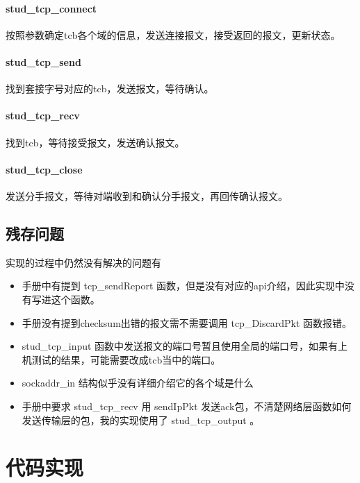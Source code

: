 \documentclass{article}
\begin{document}
\paragraph{stud\_tcp\_connect} 按照参数确定tcb各个域的信息，发送连接报文，接受返回的报文，更新状态。

\paragraph{stud\_tcp\_send} 找到套接字号对应的tcb，发送报文，等待确认。

\paragraph{stud\_tcp\_recv} 找到tcb，等待接受报文，发送确认报文。

\paragraph{stud\_tcp\_close} 发送分手报文，等待对端收到和确认分手报文，再回传确认报文。









\subsection{残存问题}

实现的过程中仍然没有解决的问题有
\begin{itemize}
    \item 手册中有提到 tcp\_sendReport 函数，但是没有对应的api介绍，因此实现中没有写进这个函数。
    \item 手册没有提到checksum出错的报文需不需要调用 tcp\_DiscardPkt 函数报错。
    \item stud\_tcp\_input 函数中发送报文的端口号暂且使用全局的端口号，如果有上机测试的结果，可能需要改成tcb当中的端口。
    \item sockaddr\_in 结构似乎没有详细介绍它的各个域是什么
    \item 手册中要求 stud\_tcp\_recv 用 sendIpPkt 发送ack包，不清楚网络层函数如何发送传输层的包，我的实现使用了 stud\_tcp\_output 。
\end{itemize}



\section{代码实现}
\end{document}
